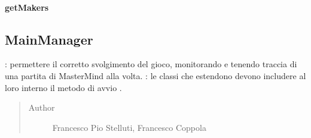 \documentclass[letterpaper,10pt,italian,openany,oneside]{sphinxmanual}
\begin{document}
\begin{fulllineitems}
\label{\detokenize{source/it/unicam/cs/pa/mastermind/gamecore/GlobalSettings:it.unicam.cs.pa.mastermind.gamecore.GlobalSettings.getBreakers()}}
\end{fulllineitems}



\paragraph{getMakers}
\label{\detokenize{source/it/unicam/cs/pa/mastermind/gamecore/GlobalSettings:getmakers}}

\begin{fulllineitems}
\label{\detokenize{source/it/unicam/cs/pa/mastermind/gamecore/GlobalSettings:it.unicam.cs.pa.mastermind.gamecore.GlobalSettings.getMakers()}}
\end{fulllineitems}



\subsection{MainManager}
\label{\detokenize{source/it/unicam/cs/pa/mastermind/gamecore/MainManager:mainmanager}}\label{\detokenize{source/it/unicam/cs/pa/mastermind/gamecore/MainManager::doc}}

\begin{fulllineitems}
\label{\detokenize{source/it/unicam/cs/pa/mastermind/gamecore/MainManager:it.unicam.cs.pa.mastermind.gamecore.MainManager}}
: permettere il corretto svolgimento del gioco, monitorando e tenendo traccia di una partita di MasterMind alla volta. : le classi che estendono  devono includere al loro interno il metodo di avvio .
\begin{quote}\begin{description}
\item[{Author}] \leavevmode
Francesco Pio Stelluti, Francesco Coppola

\end{description}\end{quote}

\end{fulllineitems}
\end{document}
